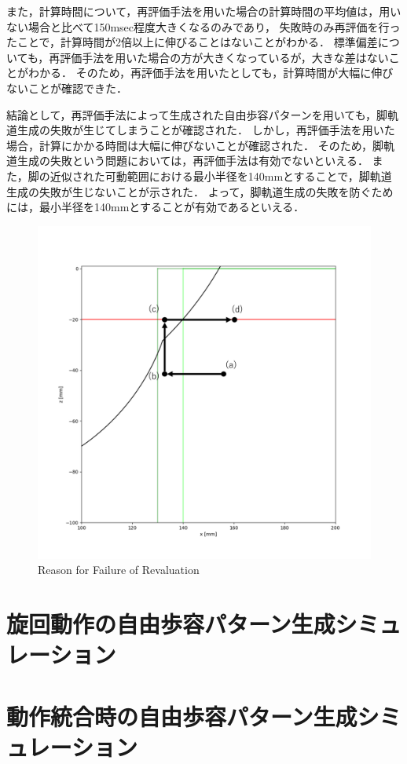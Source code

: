 また，計算時間について，再評価手法を用いた場合の計算時間の平均値は，用いない場合と比べて150msec程度大きくなるのみであり，
失敗時のみ再評価を行ったことで，計算時間が2倍以上に伸びることはないことがわかる．
標準偏差についても，再評価手法を用いた場合の方が大きくなっているが，大きな差はないことがわかる．
そのため，再評価手法を用いたとしても，計算時間が大幅に伸びないことが確認できた．

結論として，再評価手法によって生成された自由歩容パターンを用いても，脚軌道生成の失敗が生じてしまうことが確認された．
しかし，再評価手法を用いた場合，計算にかかる時間は大幅に伸びないことが確認された．
そのため，脚軌道生成の失敗という問題においては，再評価手法は有効でないといえる．
また，脚の近似された可動範囲における最小半径を140mmとすることで，脚軌道生成の失敗が生じないことが示された．
よって，脚軌道生成の失敗を防ぐためには，最小半径を140mmとすることが有効であるといえる．

\begin{figure}[htbp]
  \centering
  \includegraphics[width=0.5\linewidth]{figure/chapter4/revaluation_reason.png}
  \caption{Reason for Failure of Revaluation}
  \label{fig:ch5_revaluation_reason} %
\end{figure}

\section{旋回動作の自由歩容パターン生成シミュレーション}


\section{動作統合時の自由歩容パターン生成シミュレーション}


